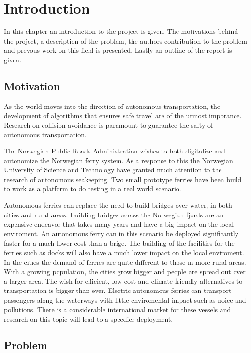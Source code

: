 
\chapter{Introduction}
In this chapter an introduction to the project is given. The motivations behind the project,
a description of the problem, the authors contribution to the problem and prevous work on this
field is presented. Lastly an outline of the report is given. 

\section{Motivation}
As the world moves into the direction of autonomous transportation, the development of
algorithms that ensures safe travel are of the utmost imporance. Research on 
collision avoidance is paramount to guarantee the safty of autonomous transportation.

The Norwegian Public Roads Administration wishes to both digitalize and autonomize the Norwegian
ferry system. As a response to this the Norwegian University of Science and Technology have
granted much attention to the research of autonomous seakeeping. Two small prototype ferries have
been build to work as a platform to do testing in a real world scenario.

Autonomous ferries can replace the need to build bridges over water, in both cities and rural areas.
Building bridges across the Norwegian fjords are an expensive endeavor that takes many years and 
have a big impact on the local enviroment. An autonomous ferry can in this scenario be deployed
significantly faster for a much lower cost than a brige. The building of the facilities for the ferries such as
docks will also have a much lower impact on the local enviroment. In the cities the demand of ferries are quite
different to those in more rural areas. With a growing population, the cities grow bigger and people
are spread out over a larger area. The wish for efficient, low cost and climate friendly alternatives to transportation
is bigger than ever. Electric autonomous ferries can transport passengers along the waterways with little enviromental impact
such as noice and pollutions. There is a considerable international market for these vessels and research on this topic will
lead to a speedier deployment. 


\section{Problem}

